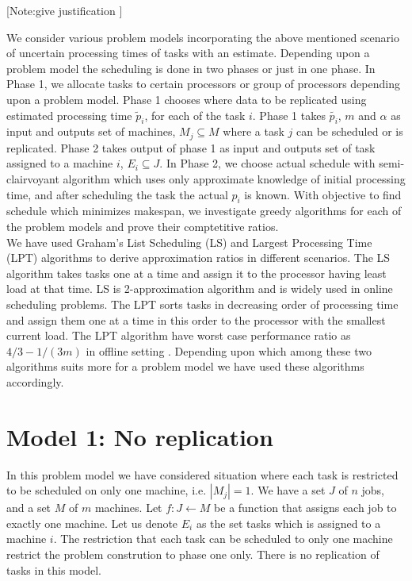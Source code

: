 \documentclass[10pt, conference, compsocconf]{IEEEtran}
\begin{document}
[Note:give justification ]


We consider various problem models  incorporating the above mentioned scenario of uncertain processing times of tasks with an estimate. Depending upon  a problem model the scheduling is done in two phases or just in one phase. In Phase 1, we allocate tasks to certain processors or group of processors depending upon a problem model.  Phase 1 chooses where data to be  replicated using estimated processing time $\tilde p_i $, for each of the task $i$. Phase 1 takes $\tilde{p_i}$, $m$ and $\alpha$ as input and outputs set of machines, $M_j \subseteq M $ where a task $j$ can be scheduled or is replicated. Phase 2 takes output of phase 1 as input and outputs set of task assigned to a machine $i$, $E_i \subseteq J$.   In Phase 2, we choose actual schedule with semi-clairvoyant algorithm which uses only approximate knowledge of initial processing time, and after scheduling the task the actual $p_i$ is known.  With  objective to find schedule which minimizes makespan, we investigate greedy algorithms for each of the problem models and prove their comptetitive ratios. \\

We have used  Graham's List Scheduling (LS) and Largest Processing Time (LPT) algorithms to derive approximation ratios in different scenarios. The LS algorithm takes tasks one at a time and assign  it to the processor having least load at that time. LS is 2-approximation algorithm and is widely used in online scheduling problems.  The LPT sorts tasks in decreasing order of processing time and assign them one at a time in this order to the processor with the smallest current load. The LPT algorithm have worst case performance ratio as $4/3-1/(3m) $ in offline setting
. Depending upon which among these two algorithms suits more for a problem model we have used these algorithms accordingly. 

\section{Model 1: No replication} 
In this problem model we have considered  situation where each task is restricted to be scheduled on only one machine, i.e. $|M_j|=1$.  We have a set $J$ of $ n$ jobs, and a set $M$ of $m$ machines.  Let $f : J \leftarrow M$ be a function that assigns each job to exactly one machine. Let us denote $E_{i}$ as the set tasks which is assigned to a machine $i$.  The restriction that each task can be scheduled to only one machine restrict the problem constrution to phase one only. There is no replication of tasks in this model.\\
\\
\end{document}
